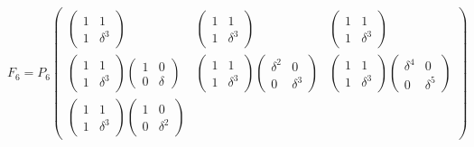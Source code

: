 \[
    F_6
    = P_6
    \begin{pmatrix}
        \begin{pmatrix}
            1 & 1        \\
            1 & \delta^3
        \end{pmatrix}
        &
        \begin{pmatrix}
            1 & 1        \\
            1 & \delta^3
        \end{pmatrix}
        &
        \begin{pmatrix}
            1 & 1        \\
            1 & \delta^3
        \end{pmatrix}
        \\
        \begin{pmatrix}
            1 & 1        \\
            1 & \delta^3
        \end{pmatrix}
        \begin{pmatrix}
            1 & 0      \\
            0 & \delta
        \end{pmatrix}
        &
        \begin{pmatrix}
            1 & 1        \\
            1 & \delta^3
        \end{pmatrix}
        \begin{pmatrix}
            \delta^2 & 0        \\
            0        & \delta^3
        \end{pmatrix}
        &
        \begin{pmatrix}
            1 & 1        \\
            1 & \delta^3
        \end{pmatrix}
        \begin{pmatrix}
            \delta^4 & 0        \\
            0        & \delta^5
        \end{pmatrix}
        \\
        \begin{pmatrix}
            1 & 1        \\
            1 & \delta^3
        \end{pmatrix}
        \begin{pmatrix}
            1 & 0        \\
            0 & \delta^2
        \end{pmatrix}

\end{pmatrix}\]
